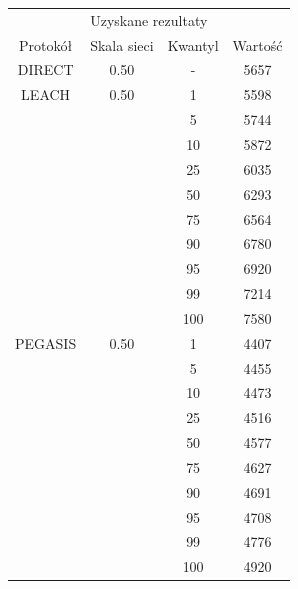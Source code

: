 \documentclass[a4paper,12pt,twoside,openany]{report}
\begin{document}
\begin{longtable}{*{4}{c}}
\toprule
\multicolumn{4}{c}{Uzyskane rezultaty} \\
Protokół	& Skala sieci	& Kwantyl	& Wartość \\
\midrule
\endhead
DIRECT	& 0.50 	& -	& 5657 \\*
\midrule
LEACH	& 0.50	& 1	& 5598 \\*
	&	& 5	& 5744 \\*
	&	& 10	& 5872 \\*
	&	& 25	& 6035 \\*
	&	& 50	& 6293 \\*
	&	& 75	& 6564 \\*
	&	& 90	& 6780 \\*
	&	& 95	& 6920 \\*
	&	& 99	& 7214 \\*
	&	& 100	& 7580 \\*
\midrule
PEGASIS	& 0.50	& 1	& 4407 \\*
	&	& 5	& 4455 \\*
	&	& 10	& 4473 \\*
	&	& 25	& 4516 \\*
	&	& 50	& 4577 \\*
	&	& 75	& 4627 \\*
	&	& 90	& 4691 \\*
	&	& 95	& 4708 \\*
	&	& 99	& 4776 \\*
	&	& 100	& 4920 \\*
\bottomrule
\end{longtable}
\end{document}
